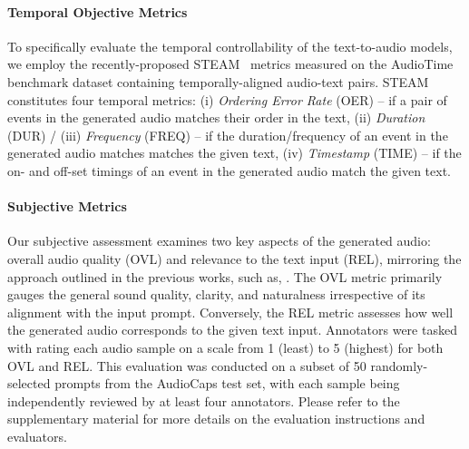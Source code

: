 \paragraph{\bf Temporal Objective Metrics} To specifically evaluate the temporal controllability of the text-to-audio models, we employ the recently-proposed STEAM~\cite{audiotime} metrics measured on the AudioTime~\cite{audiotime} benchmark dataset containing temporally-aligned audio-text pairs. STEAM constitutes four temporal metrics: (i) \emph{Ordering Error Rate} (OER) -- if a pair of events in the generated audio matches their order in the text, (ii) \emph{Duration} (DUR) / (iii) \emph{Frequency} (FREQ) -- if the duration/frequency of an event in the generated audio matches matches the given text, (iv) \emph{Timestamp} (TIME) -- if the on- and off-set timings of an event in the generated audio match the given text.

\paragraph{\bf Subjective Metrics} Our subjective assessment examines two key aspects of the generated audio: overall audio quality (OVL) and relevance to the text input (REL), mirroring the approach outlined in the previous works, such as, \cite{ghosal2023text,vyas2023audiobox}. The OVL metric primarily gauges the general sound quality, clarity, and naturalness irrespective of its alignment with the input prompt. Conversely, the REL metric assesses how well the generated audio corresponds to the given text input. Annotators were tasked with rating each audio sample on a scale from 1 (least) to 5 (highest) for both OVL and REL. This evaluation was conducted on a subset of 50 randomly-selected prompts from the AudioCaps test set, with each sample being independently reviewed by at least four annotators. Please refer to the supplementary material for more details on the evaluation instructions and evaluators.

